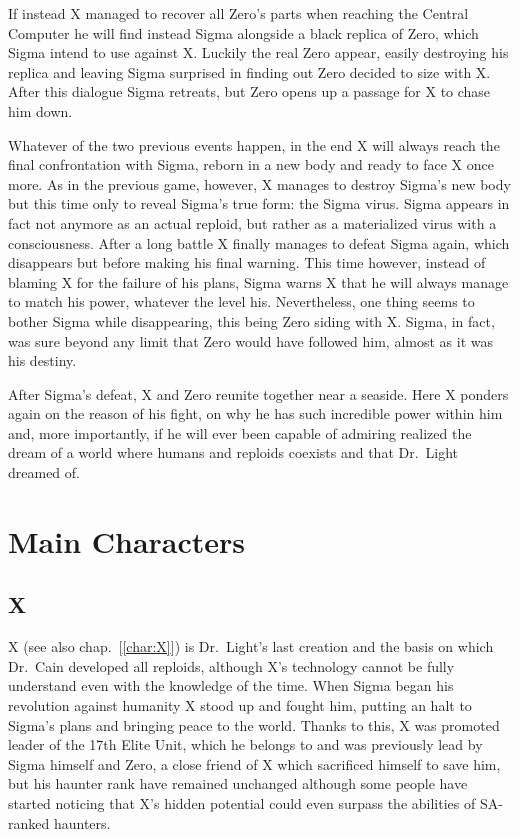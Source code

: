 If instead X managed to recover all Zero's parts when reaching the Central Computer he will find instead Sigma alongside a black replica of Zero, which Sigma intend to use against X. Luckily the real Zero appear, easily destroying his replica and leaving Sigma surprised in finding out Zero decided to size with X. After this dialogue Sigma retreats, but Zero opens up a passage for X to chase him down.

Whatever of the two previous events happen, in the end X will always reach the final confrontation with Sigma, reborn in a new body and ready to face X once more. As in the previous game, however, X manages to destroy Sigma's new body but this time only to reveal Sigma's true form: the Sigma virus. Sigma appears in fact not anymore as an actual reploid, but rather as a materialized virus with a consciousness. After a long battle X finally manages to defeat Sigma again, which disappears but before making his final warning. This time however, instead of blaming X for the failure of his plans, Sigma warns X that he will always manage to match his power, whatever the level his. Nevertheless, one thing seems to bother Sigma while disappearing, this being Zero siding with X. Sigma, in fact, was sure beyond any limit that Zero would have followed him, almost as it was his destiny.

After Sigma's defeat, X and Zero reunite together near a seaside. Here X ponders again on the reason of his fight, on why he has such incredible power within him and, more importantly, if he will ever been capable of admiring realized the dream of a world where humans and reploids coexists and that Dr.~Light dreamed of.

\section{Main Characters}

\subsection{X}
X (see also chap.~[\ref{char:X}])  is Dr.~Light's last creation and the basis on which Dr.~Cain developed all reploids, although X's technology cannot be fully understand even with the knowledge of the time. When Sigma began his revolution against humanity X stood up and fought him, putting an halt to Sigma's plans and bringing peace to the world. Thanks to this, X was promoted leader of the 17th Elite Unit, which he belongs to and was previously lead by Sigma himself and Zero, a close friend of X which sacrificed himself to save him, but his haunter rank have remained unchanged although some people have started noticing that X's hidden potential could even surpass the abilities of SA-ranked haunters.


